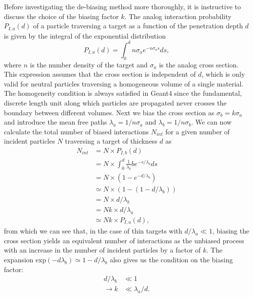 Before investigating the de-biasing method more thoroughly, it is instructive to discuss the choice of the biasing factor $k$. The analog interaction probability $P_{I,a}(d)$ of a particle traversing a target as a function of the penetration depth $d$ is given by the integral of the exponential distribution
%
\begin{equation}
    P_{I,a}(d) = \int_0^d n\sigma_a e^{-n\sigma_a s}ds,
    \label{eq:analog_pdf}
\end{equation}
%
where $n$ is the number density of the target and $\sigma_a$ is the analog cross section. This expression assumes that the cross section is independent of $d$, which is only valid for neutral particles traversing a homogeneous volume of a single material. The homogeneity condition is always satisfied in Geant4 since the fundamental, discrete length unit along which particles are propagated never crosses the boundary between different volumes. Next we bias the cross section as $\sigma_b = k\sigma_a$ and introduce the mean free paths $\lambda_a = 1 / n \sigma_a$ and $\lambda_b = 1 / n \sigma_b$. We can now calculate the total number of biased interactions $N_{int}$ for a given number of incident particles $N$ traversing a target of thickness $d$ as
%
\begin{equation} \label{eq:n_int}
\begin{split}   
    N_{int} &= N \times P_{I,b}(d)\\
    &= N \times \int_0^d \frac{1}{\lambda_b}b e^{-s/\lambda_b} ds\\
    &= N \times (1-e^{-d/\lambda_b})\\
    &\simeq N \times (1-(1-d/\lambda_b))\\
    &= N \times d/\lambda_b\\
    &= Nk \times d/\lambda_a\\
    &\simeq Nk \times P_{I,a}(d),
\end{split}
\end{equation}
%
from which we can see that, in the case of thin targets with $d / \lambda_a \ll 1$, biasing the cross section yields an equivalent number of interactions as the unbiased process with an increase in the number of incident particles by a factor of $k$. The expansion $\mathrm{exp}(-d\lambda_b) \simeq 1- d/\lambda_b$ also gives us the condition on the biasing factor:
%
\begin{equation} \label{eq:bias_estimate}
\begin{split}   
d/\lambda_b &\ll 1\\
\rightarrow k &\ll \lambda_a/d.
\end{split}   
\end{equation}
